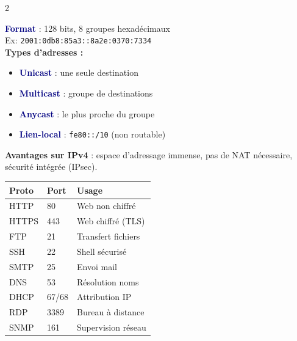 \documentclass[a4paper,10pt]{article}
\newcommand{\key}[1]{\textbf{\textcolor{navy}{#1}}}
\begin{document}
\begin{multicols}{2}
\begin{tcolorbox}[basebox, colframe=green, title=5. IPv6 — Essentiel]
\key{Format} : 128 bits, 8 groupes hexadécimaux \\
Ex: \texttt{2001:0db8:85a3::8a2e:0370:7334} \\[3pt]
\textbf{Types d'adresses :}
\begin{itemize}
  \item \key{Unicast} : une seule destination
  \item \key{Multicast} : groupe de destinations
  \item \key{Anycast} : le plus proche du groupe
  \item \key{Lien-local} : \texttt{fe80::/10} (non routable)
\end{itemize}
\textbf{Avantages sur IPv4} : espace d'adressage immense, pas de NAT nécessaire, sécurité intégrée (IPsec).
\end{tcolorbox}

\begin{tcolorbox}[basebox, colframe=navy, title=6. Protocoles applicatifs — Ports]
{\footnotesize
\begin{tabularx}{\columnwidth}{@{}llX@{}}
\toprule
\textbf{Proto} & \textbf{Port} & \textbf{Usage} \\
\midrule
HTTP  & 80    & Web non chiffré \\
HTTPS & 443   & Web chiffré (TLS) \\
FTP   & 21    & Transfert fichiers \\
SSH   & 22    & Shell sécurisé \\
SMTP  & 25    & Envoi mail \\
DNS   & 53    & Résolution noms \\
DHCP  & 67/68 & Attribution IP \\
RDP   & 3389  & Bureau à distance \\
SNMP  & 161   & Supervision réseau \\
\bottomrule
\end{tabularx}}
\end{tcolorbox}


\end{multicols}
\end{document}
